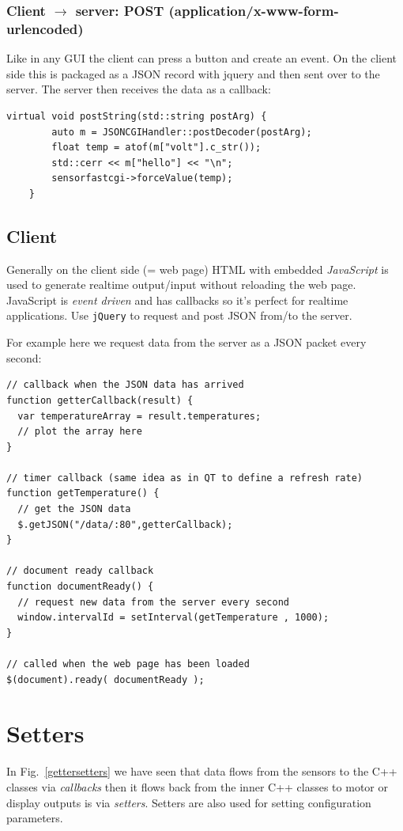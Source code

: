 \documentclass[12pt]{report}
\begin{document}
\subsection{Client $\to$ server: POST (application/x-www-form-urlencoded)}
Like in any GUI the client can press a button and create an event.
On the client side this is packaged as a JSON record with
jquery and then sent over to the server. The server then
receives the data as a callback:
\begin{verbatim}
virtual void postString(std::string postArg) {
		auto m = JSONCGIHandler::postDecoder(postArg);
		float temp = atof(m["volt"].c_str());
		std::cerr << m["hello"] << "\n";
		sensorfastcgi->forceValue(temp);
	}
\end{verbatim} 

\section{Client}
Generally on the client side (= web page) HTML with embedded
\textsl{JavaScript} is used to generate realtime output/input without
reloading the web page. JavaScript is \textsl{event driven} and has
callbacks so it's perfect for realtime applications. Use
\texttt{jQuery} to request and post JSON from/to the server.

For example here we request data from the server as a JSON
packet every second:

\begin{verbatim}
// callback when the JSON data has arrived
function getterCallback(result) {
  var temperatureArray = result.temperatures;
  // plot the array here
}

// timer callback (same idea as in QT to define a refresh rate)
function getTemperature() {
  // get the JSON data
  $.getJSON("/data/:80",getterCallback);
}

// document ready callback
function documentReady() {
  // request new data from the server every second
  window.intervalId = setInterval(getTemperature , 1000);
}

// called when the web page has been loaded
$(document).ready( documentReady );
\end{verbatim}


\chapter{Setters}

In Fig.~\ref{gettersetters} we have seen that data flows from
the sensors to the C++ classes via \textsl{callbacks} then it flows
back from the inner C++ classes to motor or display outputs is via
\textsl{setters}. Setters are also used for setting configuration
parameters.
\end{document}
